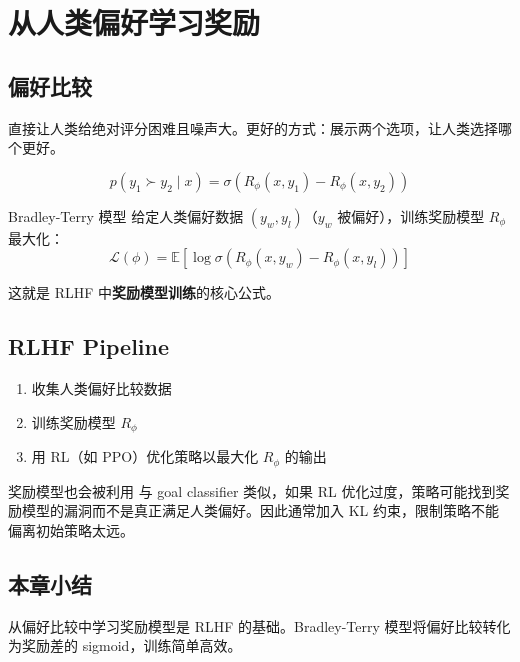 \section{从人类偏好学习奖励}

\subsection{偏好比较}

直接让人类给绝对评分困难且噪声大。更好的方式：展示两个选项，让人类选择哪个更好。

$$p(y_1 \succ y_2 \mid x) = \sigma\left(R_\phi(x, y_1) - R_\phi(x, y_2)\right)$$

\begin{importantbox}{Bradley-Terry 模型}
给定人类偏好数据 $(y_w, y_l)$（$y_w$ 被偏好），训练奖励模型 $R_\phi$ 最大化：
$$\mathcal{L}(\phi) = \mathbb{E}\left[\log \sigma\left(R_\phi(x, y_w) - R_\phi(x, y_l)\right)\right]$$

这就是 RLHF 中\textbf{奖励模型训练}的核心公式。
\end{importantbox}

\subsection{RLHF Pipeline}

\begin{enumerate}
    \item 收集人类偏好比较数据
    \item 训练奖励模型 $R_\phi$
    \item 用 RL（如 PPO）优化策略以最大化 $R_\phi$ 的输出
\end{enumerate}

\begin{warningbox}{奖励模型也会被利用}
与 goal classifier 类似，如果 RL 优化过度，策略可能找到奖励模型的漏洞而不是真正满足人类偏好。因此通常加入 KL 约束，限制策略不能偏离初始策略太远。
\end{warningbox}

\subsection{本章小结}

从偏好比较中学习奖励模型是 RLHF 的基础。Bradley-Terry 模型将偏好比较转化为奖励差的 sigmoid，训练简单高效。

